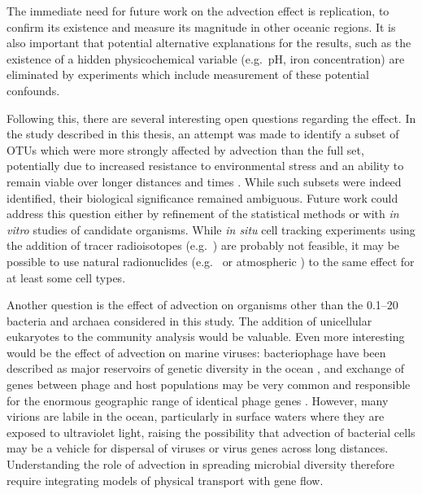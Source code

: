 The immediate need for future work on the advection effect is replication, to confirm its existence and measure its magnitude in other oceanic regions.
It is also important that potential alternative explanations for the results, such as the existence of a hidden physicochemical variable (e.g.\ pH, iron concentration) are eliminated by experiments which include measurement of these potential confounds.

Following this, there are several interesting open questions regarding the effect.
In the study described in this thesis, an attempt was made to identify a subset of \acp{OTU} which were more strongly affected by advection than the full set, potentially due to increased resistance to environmental stress and an ability to remain viable over longer distances and times \cite{Bissett:2010wj}.
While such subsets were indeed identified, their biological significance remained ambiguous.
Future work could address this question either by refinement of the statistical methods or with \textit{in vitro} studies of candidate organisms.
While \textit{in situ} cell tracking experiments using the addition of tracer radioisotopes (e.g.\ ) are probably not feasible, it may be possible to use natural radionuclides (e.g.\  \cite{Savoye:2005ck} or atmospheric  \cite{Feng:1999ww}) to the same effect for at least some cell types.

Another question is the effect of advection on organisms other than the 0.1--20 \micron{} bacteria and archaea considered in this study.
The addition of unicellular eukaryotes to the community analysis would be valuable.
Even more interesting would be the effect of advection on marine viruses: bacteriophage have been described as major reservoirs of genetic diversity in the ocean \cite{Suttle:2005bs}, and exchange of genes between phage and host populations may be very common and responsible for the enormous geographic range of identical phage genes \citep[reviewed in][]{Hambly:2005cm}.
However, many virions are labile in the ocean, particularly in surface waters where they are exposed to ultraviolet light, raising the possibility that advection of bacterial cells may be a vehicle for dispersal of viruses or virus genes across long distances.
Understanding the role of advection in spreading microbial diversity therefore require integrating models of physical transport with gene flow.

\subsection{}

